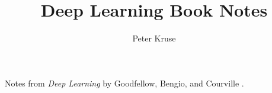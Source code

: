 \documentclass{article}
\title{Deep Learning Book Notes}
\author{Peter Kruse}
\begin{document}
\maketitle

Notes from \textit{Deep Learning} by Goodfellow, Bengio, and Courville \cite{deeplearningbook}.

\tableofcontents





\end{document}
